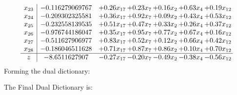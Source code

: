 \documentclass[8pt]{article}
\begin{document}
\[\begin{array}{c| c c@{\hskip 2pt} c@{\hskip 2pt} c@{\hskip 2pt} c@{\hskip 2pt} c@{\hskip 2pt} }
 x_{23}   &  -0.116279069767 & +  0.26 x_{17} & +  0.23 x_{7} & +  0.16 x_{2} & +  0.63 x_{4} & +  0.19 x_{12}\\
 x_{24}   &  -0.209302325581 & +  0.36 x_{17} & +  0.92 x_{7} & +  0.09 x_{2} & +  0.43 x_{4} & +  0.53 x_{12}\\
 x_{25}   &  -0.232558139535 & +  0.51 x_{17} & +  0.47 x_{7} & +  0.33 x_{2} & +  0.26 x_{4} & +  0.37 x_{12}\\
 x_{26}   &  -0.976744186047 & +  0.35 x_{17} & +  0.95 x_{7} & +  0.77 x_{2} & +  0.67 x_{4} & +  0.16 x_{12}\\
 x_{27}   &  -0.511627906977 & +  0.83 x_{17} & +  0.52 x_{7} & +  0.12 x_{2} & +  0.66 x_{4} & +  0.42 x_{12}\\
 x_{28}   &  -0.186046511628 & +  0.71 x_{17} & +  0.87 x_{7} & +  0.86 x_{2} & +  0.10 x_{4} & +  0.70 x_{12}\\
\hline
z    &  -8.6511627907 & -0.27 x_{17} & -0.20 x_{7} & -0.49 x_{2} & -0.38 x_{4} & -0.56 x_{12}\\
\end{array}\]
Forming the dual dictionary:

The Final Dual Dictionary is: 
\end{document}
